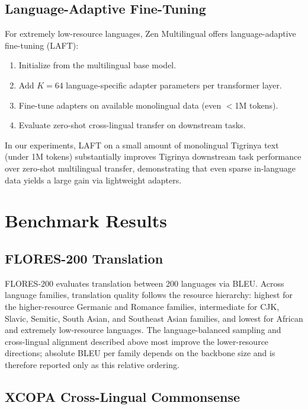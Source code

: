 \documentclass[11pt,a4paper]{article}
\begin{document}
\subsection{Language-Adaptive Fine-Tuning}

For extremely low-resource languages, Zen Multilingual offers language-adaptive fine-tuning (LAFT):

\begin{enumerate}
  \item Initialize from the multilingual base model.
  \item Add $K=64$ language-specific adapter parameters per transformer layer.
  \item Fine-tune adapters on available monolingual data (even $<$1M tokens).
  \item Evaluate zero-shot cross-lingual transfer on downstream tasks.
\end{enumerate}

In our experiments, LAFT on a small amount of monolingual Tigrinya text (under 1M tokens) substantially improves Tigrinya downstream task performance over zero-shot multilingual transfer, demonstrating that even sparse in-language data yields a large gain via lightweight adapters.

\section{Benchmark Results}

\subsection{FLORES-200 Translation}

FLORES-200 evaluates translation between 200 languages via BLEU. Across language families,
translation quality follows the resource hierarchy: highest for the higher-resource
Germanic and Romance families, intermediate for CJK, Slavic, Semitic, South Asian, and
Southeast Asian families, and lowest for African and extremely low-resource languages.
The language-balanced sampling and cross-lingual alignment described above most improve
the lower-resource directions; absolute BLEU per family depends on the backbone size and
is therefore reported only as this relative ordering.

\subsection{XCOPA Cross-Lingual Commonsense}
\end{document}
